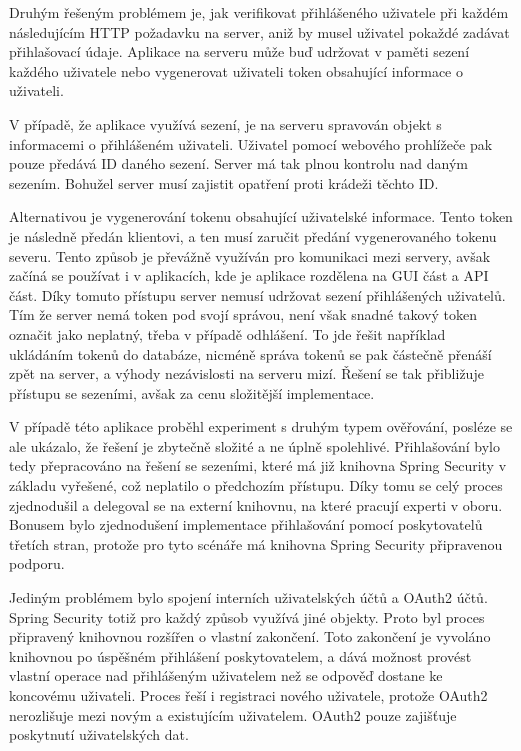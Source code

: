 			Druhým řešeným problémem je, jak verifikovat přihlášeného uživatele při každém následujícím \ac{HTTP} požadavku na server,
			aniž by musel uživatel pokaždé zadávat přihlašovací údaje.
			Aplikace na serveru může buď udržovat v paměti sezení každého uživatele nebo vygenerovat uživateli token
			obsahující informace o uživateli.

			V případě, že aplikace využívá sezení, je na serveru spravován objekt s informacemi o přihlášeném uživateli.
			Uživatel pomocí webového prohlížeče pak pouze předává ID daného sezení.
			Server má tak plnou kontrolu nad daným sezením.
			Bohužel server musí zajistit opatření proti krádeži těchto ID.

			Alternativou je vygenerování tokenu obsahující uživatelské informace.
			Tento token je následně předán klientovi, a ten musí zaručit předání vygenerovaného tokenu severu.
			Tento způsob je převážně využíván pro komunikaci mezi servery, avšak začíná se používat i v aplikacích, kde
			je aplikace rozdělena na \ac{GUI} část a \ac{API} část.
			Díky tomuto přístupu server nemusí udržovat sezení přihlášených uživatelů.
			Tím že server nemá token pod svojí správou, není však snadné takový token označit jako neplatný, třeba v případě odhlášení.
			To jde řešit například ukládáním tokenů do databáze, nicméně správa tokenů se pak částečně přenáší zpět
			na server, a výhody nezávislosti na serveru mizí.
			Řešení se tak přibližuje přístupu se sezeními, avšak za cenu složitější implementace.

			V případě této aplikace proběhl experiment s druhým typem ověřování, posléze se ale ukázalo, že
			řešení je zbytečně složité a ne úplně spolehlivé.
			Přihlašování bylo tedy přepracováno na řešení se sezeními, které má již knihovna Spring Security v základu
			vyřešené, což neplatilo o předchozím přístupu.
			Díky tomu se celý proces zjednodušil a delegoval se na externí knihovnu, na které pracují experti v oboru.
			Bonusem bylo zjednodušení implementace přihlašování pomocí poskytovatelů třetích stran, protože pro tyto scénáře
			má knihovna Spring Security připravenou podporu.

			Jediným problémem bylo spojení interních uživatelských účtů a OAuth2 účtů.
			Spring Security totiž pro každý způsob využívá jiné objekty.
			Proto byl proces připravený knihovnou rozšířen o vlastní zakončení.
			Toto zakončení je vyvoláno knihovnou po úspěšném přihlášení poskytovatelem, a dává možnost provést vlastní operace nad
			přihlášeným uživatelem než se odpověď dostane ke koncovému uživateli.
			Proces řeší i registraci nového uživatele, protože OAuth2 nerozlišuje mezi novým a existujícím uživatelem.
			OAuth2 pouze zajišťuje poskytnutí uživatelských dat.

